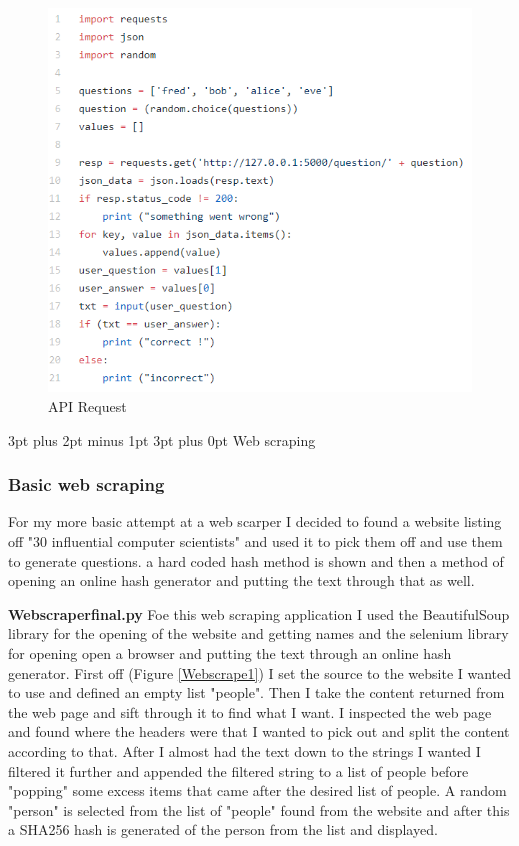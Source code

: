\documentclass[12pt,a4paper]{article}
\makeatletter
\renewcommand\subsection{\@startsection {subsection}{1}{2mm} %
                               {3pt plus 2pt minus 1pt} %
                               {3pt plus 0pt} %
                               {\normalfont\bfseries}}
\makeatother
\begin{document}
\begin{figure}[h]
    \centering
    \includegraphics[width=1.0\textwidth]{Figs/API request.PNG} 
    \caption{API Request} 
    \label{API request}
\end{figure}

\subsection{Web scraping} 
\subsubsection{Basic web scraping}   
For my more basic attempt at a web scarper I decided to found a website listing off "30 influential computer scientists" and used it to pick them off and use them to generate questions. a hard coded hash method is shown and then a method of opening an online hash generator and putting the text through that as well. 

\textbf{Web\textunderscore scraper\textunderscore final.py}  
Foe this web scraping application I used the BeautifulSoup library for the opening of the website and getting names and the selenium library for opening open a browser and putting the text through an online hash generator. First off (Figure \ref{Webscrape1}) I set the source to the website I wanted to use and defined an empty list "people". Then I take the content returned from the web page and sift through it to find what I want. I inspected the web page and found where the headers were that I wanted to pick out and split the content according to that. After I almost had the text down to the strings I wanted I filtered it further and appended the filtered string to a list of people before "popping" some excess items that came after the desired list of people. A random "person" is selected from the list of "people" found from the website and after this a SHA256 hash is generated of the person from the list and displayed. 
\end{document}
